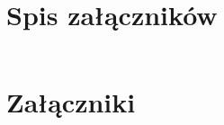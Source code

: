 \chapter*{Spis załączników}
\noindent

\begin{tabularx}{\textwidth}{Xl}

\end{tabularx}

\chapter*{Załączniki}
